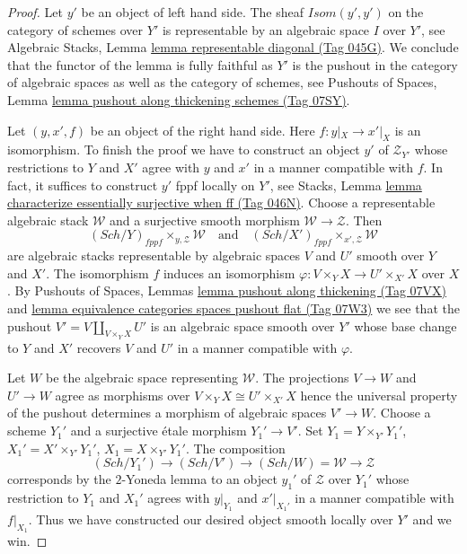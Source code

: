 \documentclass{amsart}
\theoremstyle{plain}
\theoremstyle{definition}
\theoremstyle{remark}
\numberwithin{equation}{subsection}
\def\Sch{\mathit{Sch}}
\begin{document}
\begin{proof}
Let $y'$ be an object of left hand side. The sheaf
$\mathit{Isom}(y', y')$ on the category of schemes over $Y'$
is representable by an algebraic space $I$ over $Y'$, see
Algebraic Stacks, Lemma \href{https://stacks.math.columbia.edu/tag/045G}{lemma representable diagonal (Tag 045G)}.
We conclude that the functor of the lemma is fully faithful as
$Y'$ is the pushout in the category of algebraic spaces as
well as the category of schemes, see
Pushouts of Spaces, Lemma
\href{https://stacks.math.columbia.edu/tag/07SY}{lemma pushout along thickening schemes (Tag 07SY)}.

\medskip\noindent
Let $(y, x', f)$ be an object of the right hand side. Here $f : y|_X \to x'|_X$
is an isomorphism. To finish the proof we have to construct an object $y'$ of
$\mathcal{Z}_{Y'}$ whose restrictions to $Y$ and $X'$ agree with $y$ and $x'$
in a manner compatible with $f$. In fact, it suffices to construct $y'$
fppf locally on $Y'$, see
Stacks, Lemma \href{https://stacks.math.columbia.edu/tag/046N}{lemma characterize essentially surjective when ff (Tag 046N)}.
Choose a representable algebraic stack
$\mathcal{W}$ and a surjective smooth morphism $\mathcal{W} \to \mathcal{Z}$.
Then
$$
(\Sch/Y)_{fppf} \times_{y, \mathcal{Z}} \mathcal{W}
\quad\text{and}\quad
(\Sch/X')_{fppf} \times_{x', \mathcal{Z}} \mathcal{W}
$$
are algebraic stacks representable by algebraic spaces $V$ and $U'$
smooth over $Y$ and $X'$. The isomorphism $f$ induces an isomorphism
$\varphi : V \times_Y X \to U' \times_{X'} X$ over $X$. By
Pushouts of Spaces, Lemmas
\href{https://stacks.math.columbia.edu/tag/07VX}{lemma pushout along thickening (Tag 07VX)} and
\href{https://stacks.math.columbia.edu/tag/07W3}{lemma equivalence categories spaces pushout flat (Tag 07W3)}
we see that the pushout $V' = V \amalg_{V \times_Y X} U'$ is
an algebraic space smooth over $Y'$ whose base change to
$Y$ and $X'$ recovers $V$ and $U'$ in a manner compatible with $\varphi$.

\medskip\noindent
Let $W$ be the algebraic space representing $\mathcal{W}$.
The projections $V \to W$ and $U' \to W$ agree as morphisms
over $V \times_Y X \cong U' \times_{X'} X$ hence the universal
property of the pushout determines a morphism of algebraic spaces
$V' \to W$. Choose a scheme $Y_1'$ and a surjective \'etale morphism
$Y_1' \to V'$. Set $Y_1 = Y \times_{Y'} Y_1'$,
$X_1' = X' \times_{Y'} Y_1'$, $X_1 = X \times_{Y'} Y_1'$.
The composition
$$
(\Sch/Y_1') \to (\Sch/V') \to (\Sch/W) = \mathcal{W} \to \mathcal{Z}
$$
corresponds by the $2$-Yoneda lemma to an object $y_1'$ of $\mathcal{Z}$
over $Y_1'$ whose restriction to $Y_1$ and $X_1'$ agrees with $y|_{Y_1}$
and $x'|_{X_1'}$ in a manner compatible with $f|_{X_1}$. Thus we have
constructed our desired object smooth locally over $Y'$ and we win.
\end{proof}
\end{document}
